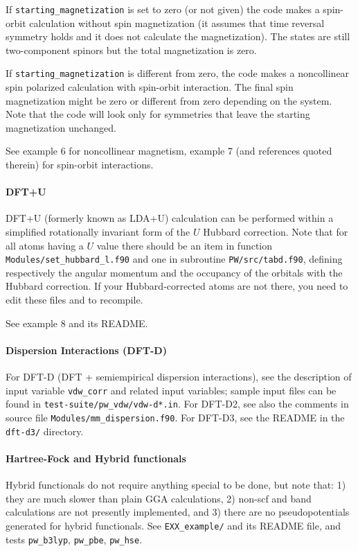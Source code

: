 \documentclass[12pt,a4paper]{article}
\begin{document}
If \texttt{starting\_magnetization} is set to zero (or not given) 
the code makes a spin-orbit calculation without spin magnetization 
(it assumes that time reversal symmetry holds and it does not calculate 
the magnetization). The states are still two-component spinors but the
total magnetization is zero. 

If \texttt{starting\_magnetization} is different from zero, the code makes a 
noncollinear spin polarized calculation with spin-orbit interaction. The 
final spin magnetization might be zero or different from zero depending 
on the system. Note that the code will look only for symmetries that leave
the starting magnetization unchanged.

See example 6 for noncollinear magnetism, example 7 (and references
quoted therein) for spin-orbit interactions.

\paragraph{DFT+U}
DFT+U (formerly known as LDA+U) calculation can be
performed within a simplified rotationally invariant form 
of the $U$ Hubbard correction. Note that for all atoms having 
a $U$ value there should be an item in function
\texttt{Modules/set\_hubbard\_l.f90} and one in 
subroutine \texttt{PW/src/tabd.f90}, defining respectively
the angular momentum and the occupancy of the orbitals with
the Hubbard correction. If your Hubbard-corrected atoms are not
there, you need to edit these files and to recompile.

See example 8 and its README.

\paragraph{Dispersion Interactions (DFT-D)}
For DFT-D (DFT + semiempirical dispersion interactions), see the
description of input variable \texttt{vdw\_corr} and related
input variables; sample input files can be found in
\texttt{test-suite/pw\_vdw/vdw-d*.in}. For DFT-D2, see also the
comments in source file \texttt{Modules/mm\_dispersion.f90}.
For DFT-D3, see the README in the \texttt{dft-d3/} directory.

\paragraph{Hartree-Fock and Hybrid functionals}

Hybrid functionals do not require anything special to be done,
but note that: 1) they are much slower than plain GGA calculations,
2) non-scf and band calculations are not presently implemented, and
3) there are no pseudopotentials generated for hybrid functionals.
See \texttt{EXX\_example/} and its README file, and tests
\texttt{pw\_b3lyp}, \texttt{pw\_pbe}, \texttt{pw\_hse}.
\end{document}
